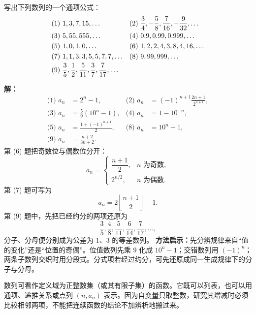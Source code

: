 \begin{examplebox}
  写出下列数列的一个通项公式：
  \[
  \begin{array}{ll}
    \text{(1) }1,3,7,15,\ldots
      &\text{(2) }\dfrac34,-\dfrac58,\dfrac7{16},-\dfrac9{32},\ldots\\[6pt]
    \text{(3) }5,55,555,\ldots
      &\text{(4) }0.9,0.99,0.999,\ldots\\[3pt]
    \text{(5) }1,0,1,0,\ldots
      &\text{(6) }1,2,2,4,3,8,4,16,\ldots\\[3pt]
    \text{(7) }1,1,3,3,5,5,7,7,\ldots
      &\text{(8) }9,99,999,\ldots
      \\[3pt]
    \multicolumn{2}{l}{\text{(9) }\dfrac35,\dfrac12,\dfrac5{11},\dfrac37,\dfrac7{17},\ldots}
  \end{array}
  \]

  \textbf{解：}
  \begin{align*}
    \text{(1) }a_n&=2^n-1,
    &\text{(2) }a_n&=(-1)^{n+1}\frac{2n+1}{2^{n+1}},\\
    \text{(3) }a_n&=\frac59(10^n-1),
    &\text{(4) }a_n&=1-10^{-n},\\
    \text{(5) }a_n&=\frac{1+(-1)^{n+1}}2,
    &\text{(8) }a_n&=10^n-1,\\
    \text{(9) }a_n&=\frac{n+2}{3n+2}.
  \end{align*}
  第 (6) 题把奇数位与偶数位分开：
  \[
    a_n=
    \begin{cases}
      \dfrac{n+1}{2},&n\text{ 为奇数},\\[4pt]
      2^{n/2},&n\text{ 为偶数}.
    \end{cases}
  \]
  第 (7) 题可写为
  \[
    a_n=2\left\lfloor\frac{n+1}{2}\right\rfloor-1.
  \]
  第 (9) 题中，先把已经约分的两项还原为
  \[
    \frac35,\frac48,\frac5{11},\frac6{14},\frac7{17},\ldots,
  \]
  分子、分母便分别成为公差为 $1$、$3$ 的等差数列。
  \textbf{方法启示：}先分辨规律来自“值的变化”还是“位置的奇偶”。位值数列先乘 $9$ 化成 $10^n-1$；交错数列用 $(-1)^n$；两条子数列交织时用分段式。分式项若经过约分，可先还原成同一生成规律下的分子与分母。
\end{examplebox}

数列可看作定义域为正整数集（或其有限子集）的函数。它既可以列表，也可以用通项、递推关系或点列 $(n,a_n)$ 表示。因为自变量只取整数，研究其增减时必须比较相邻两项，不能把连续函数的结论不加辨析地搬过来。

\begin{center}
\end{center}

